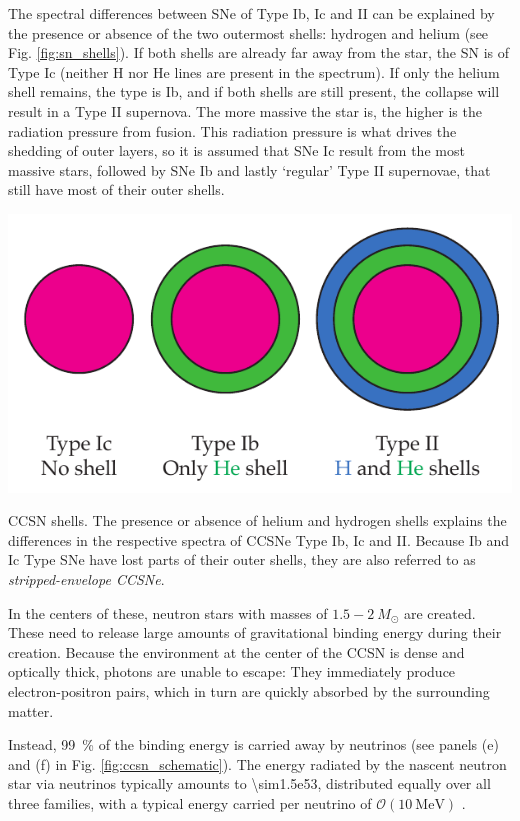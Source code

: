 \documentclass[
    a4paper, %
    fontsize=10pt, %
    twoside=false, %
    numbers=noenddot, %
    fontmethod=tex,
]{kaobook}
\begin{document}
The spectral differences between SNe of Type Ib, Ic and II can be explained by the presence or absence of the two outermost shells: hydrogen and helium (see Fig. \ref{fig:sn_shells}). If both shells are already far away from the star, the SN is of Type Ic (neither H nor He lines are present in the spectrum). If only the helium shell remains, the type is Ib, and if both shells are still present, the collapse will result in a Type II supernova. The more massive the star is, the higher is the radiation pressure from fusion. This radiation pressure is what drives the shedding of outer layers, so it is assumed that SNe Ic result from the most massive stars, followed by SNe Ib and lastly `regular' Type II supernovae, that still have most of their outer shells.

\begin{marginfigure}
    \includegraphics{theory/sn_shells.pdf}
    \caption[CCSN shells]{CCSN shells. The presence or absence of helium and hydrogen shells explains the differences in the respective spectra of CCSNe Type Ib, Ic and II. Because Ib and Ic Type SNe have lost parts of their outer shells, they are also referred to as \textit{stripped-envelope CCSNe}.}
\end{marginfigure}

In the centers of these, neutron stars with masses of $1.5-2~M_\odot$ are created. These need to release large amounts of gravitational binding energy during their creation. Because the environment at the center of the CCSN is dense and optically thick, photons are unable to escape: They immediately produce electron-positron pairs, which in turn are quickly absorbed by the surrounding matter.

Instead, \SI{99}{\percent} of the binding energy is carried away by neutrinos (see panels (e) and (f) in Fig. \ref{fig:ccsn_schematic}). The energy radiated by the nascent neutron star via neutrinos typically amounts to \SI{\sim1.5e53}{\erg}, distributed equally over all three families, with a typical energy carried per neutrino of $\mathcal{O}(\SI{10}{\mega\eV})$ . 
\end{document}
